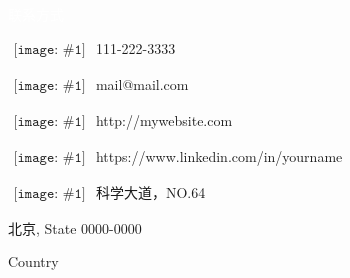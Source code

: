 
\newcommand{\ContactEntry}[2]{
	$\begin{array}{l}
	{\texttt{[image: \#1]}}
	\end{array}
	$ #2
}


\LARGE
\noindent\colorbox{materialGreen}
{\parbox[c][25pt][c]{\textwidth}{\hspace{15pt}\textcolor{white}{联系方式}}} %

\begin{multicols}{2}

\large
\ContactEntry{images/green/telephone1}{111-222-3333}

\ContactEntry{images/green/mail9}{mail@mail.com}

\ContactEntry{images/green/links1}{http://mywebsite.com}

\ContactEntry{images/green/linkedin2}{https://www.linkedin.com/in/yourname}

\columnbreak

\ContactEntry{images/green/house3}{科学大道，NO.64

\hspace*{25pt} 北京, State 0000-0000

\hspace*{25pt} Country}


\end{multicols}
